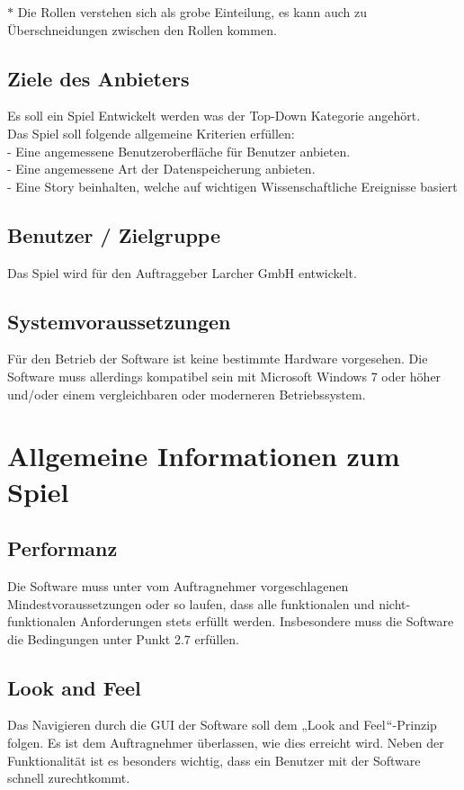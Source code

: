 \documentclass[12pt]{article}
\begin{document}
$\ast$ Die Rollen verstehen sich als grobe Einteilung, es kann auch zu Überschneidungen zwischen den Rollen kommen.


\subsection{Ziele des Anbieters}
Es soll ein Spiel Entwickelt werden was der Top-Down Kategorie angehört.\\
Das Spiel soll folgende allgemeine Kriterien erfüllen:\\
- Eine angemessene Benutzeroberfläche für Benutzer anbieten.\\
- Eine angemessene Art der Datenspeicherung anbieten.\\
- Eine Story beinhalten, welche auf wichtigen Wissenschaftliche Ereignisse basiert

\subsection{Benutzer / Zielgruppe}
Das Spiel wird für den Auftraggeber Larcher GmbH entwickelt.

\subsection{Systemvoraussetzungen}
Für den Betrieb der Software ist keine bestimmte Hardware vorgesehen. Die Software muss allerdings kompatibel sein mit Microsoft Windows 7 oder höher und/oder einem vergleichbaren oder moderneren Betriebssystem.

\section{Allgemeine Informationen zum Spiel}
\subsection{Performanz}
Die Software muss unter vom Auftragnehmer vorgeschlagenen Mindestvoraussetzungen oder so laufen, dass alle funktionalen und nicht-funktionalen Anforderungen stets erfüllt werden. Insbesondere muss die Software die Bedingungen unter Punkt 2.7 erfüllen.

\subsection{Look and Feel}
Das Navigieren durch die GUI der Software soll dem „Look and Feel$``$-Prinzip folgen. Es ist dem Auftragnehmer überlassen, wie dies erreicht wird. Neben der Funktionalität ist es besonders wichtig, dass ein Benutzer mit der Software schnell zurechtkommt.
\end{document}
